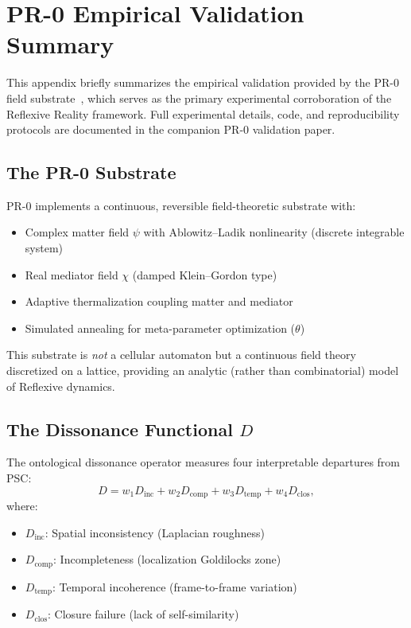 
\section{PR-0 Empirical Validation Summary}
\label{app:pr0-validation-summary}

This appendix briefly summarizes the empirical validation provided by the PR-0 field substrate~\cite{SpivackSDS_PR0}, which serves as the primary experimental corroboration of the Reflexive Reality framework. Full experimental details, code, and reproducibility protocols are documented in the companion PR-0 validation paper.

\subsection{The PR-0 Substrate}

PR-0 implements a continuous, reversible field-theoretic substrate with:
\begin{itemize}
  \item Complex matter field \(\psi\) with Ablowitz--Ladik nonlinearity (discrete integrable system)
  \item Real mediator field \(\chi\) (damped Klein--Gordon type)
  \item Adaptive thermalization coupling matter and mediator
  \item Simulated annealing for meta-parameter optimization (\(\theta\))
\end{itemize}

This substrate is \emph{not} a cellular automaton but a continuous field theory discretized on a lattice, providing an analytic (rather than combinatorial) model of Reflexive dynamics.

\subsection{The Dissonance Functional \(D\)}

The ontological dissonance operator measures four interpretable departures from PSC:
\begin{equation}
D = w_1 D_{\mathrm{inc}} + w_2 D_{\mathrm{comp}} + w_3 D_{\mathrm{temp}} + w_4 D_{\mathrm{clos}},
\end{equation}
where:
\begin{itemize}
  \item \(D_{\mathrm{inc}}\): Spatial inconsistency (Laplacian roughness)
  \item \(D_{\mathrm{comp}}\): Incompleteness (localization Goldilocks zone)
  \item \(D_{\mathrm{temp}}\): Temporal incoherence (frame-to-frame variation)
  \item \(D_{\mathrm{clos}}\): Closure failure (lack of self-similarity)
\end{itemize}

